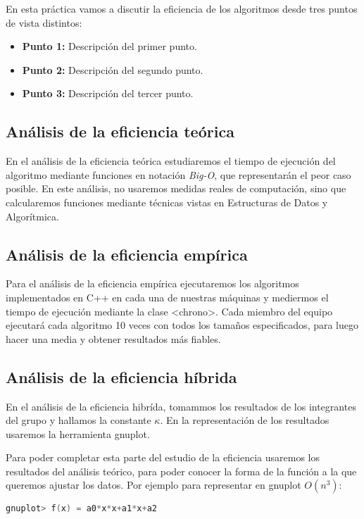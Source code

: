 \documentclass[a4paper,12pt]{article} %
\begin{document}
En esta práctica vamos a discutir la eficiencia de los algoritmos
desde tres puntos de vista distintos:

\begin{itemize}
	\item \textbf{Punto 1:} Descripción del primer punto.
	\item \textbf{Punto 2:} Descripción del segundo punto.
	\item \textbf{Punto 3:} Descripción del tercer punto.
\end{itemize}

\subsection{Análisis de la eficiencia teórica}
En el análisis de la eficiencia teórica estudiaremos el tiempo de ejecución del algoritmo
mediante funciones en notación \textit{Big-O}, que representarán el peor caso posible.
En este análisis, no usaremos medidas reales de computación, sino que calcularemos funciones
mediante técnicas vistas en Estructuras de Datos y Algorítmica.
\subsection{Análisis de la eficiencia empírica}
Para el análisis de la eficiencia empírica ejecutaremos los algoritmos implementados en C++ en cada
una de nuestras máquinas y mediermos el tiempo de ejecución mediante la
clase <chrono>. Cada miembro del equipo ejecutará cada algoritmo 10 veces con todos los tamaños especificados,
para luego hacer una media y obtener resultados más fiables.
\subsection{Análisis de la eficiencia híbrida}
En el análisis de la eficiencia hibrída, tomammos los resultados de los integrantes del grupo y hallamos
la constante $\kappa$. En la representación de los resultados usaremos la herramienta gnuplot.

Para poder completar esta parte del estudio de la eficiencia usaremos los resultados del análisis teórico, para
poder conocer la forma de la función a la que queremos ajustar los datos. Por ejemplo para representar en gnuplot $O(n^{3})$:

\begin{lstlisting}[language=C, caption={Ejemplo de $O(n^{2})$}]
       gnuplot> f(x) = a0*x*x+a1*x+a2
        \end{lstlisting}
\end{document}
